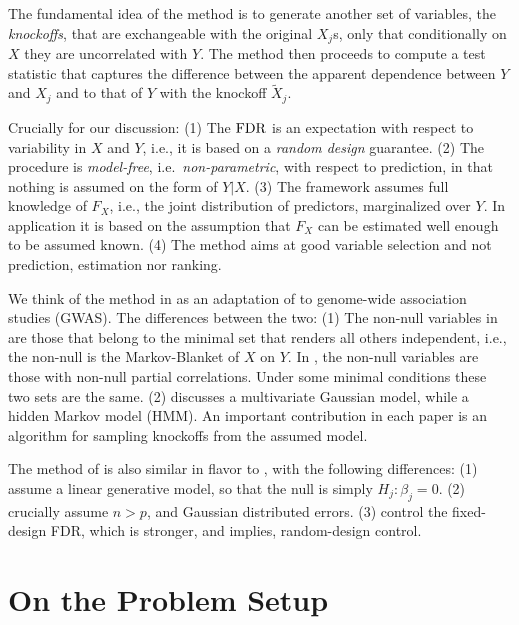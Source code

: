 \documentclass[article,lineno]{biometrika}
\begin{document}
	The fundamental idea of the method is to generate another set of variables, the \emph{knockoffs}, that are exchangeable with the original $X_j$s, only that  conditionally on $X$ they are uncorrelated with $Y$.
	The method then proceeds to compute a test statistic that captures the difference between the apparent dependence between $Y$ and $X_j$ and to that of $Y$ with the knockoff $\tilde X_j$.
	
	Crucially for our discussion:
	(1) The $\rm{FDR}$ is an expectation with respect to variability in $X$ and $Y$, i.e., it is based on  a \emph{random design} guarantee.
	(2) The procedure is \emph{model-free}, i.e.\ \emph{non-parametric}, with respect to prediction, in that nothing is assumed on the form of $Y|X$.
	(3) The framework assumes full knowledge of $F_X$, i.e., the joint distribution of predictors, marginalized over $Y$. In application it is based on the assumption that $F_X$ can be estimated well enough to be assumed known.
	(4) The method aims at good variable selection and not prediction, estimation nor ranking.
	
	We think of the method in \cite{SesiaGenehuntinghidden} as an adaptation of \cite{CandesPanninggoldmodelX2018} to genome-wide association studies (GWAS).
	The differences between the two:
	(1) The non-null variables in \cite{CandesPanninggoldmodelX2018} are those that belong to the minimal set that renders all others independent, i.e., the non-null is the Markov-Blanket of $X$ on $Y$.
	In \cite{SesiaGenehuntinghidden}, the non-null variables are those with non-null partial correlations. Under some minimal conditions these two sets are the same.
	(2) \cite{CandesPanninggoldmodelX2018} discusses a multivariate Gaussian model, while \cite{SesiaGenehuntinghidden} a hidden Markov model (HMM).
	An important contribution in each paper is an algorithm for sampling knockoffs from the assumed model.
	
	The method of \cite{SesiaGenehuntinghidden} is also similar in flavor to \cite{BarberControllingfalsediscovery2015}, with the following differences:
	(1) \cite{BarberControllingfalsediscovery2015} assume a linear generative model, so that the null is simply $H_j:\beta_j=0$.
	(2) \cite{BarberControllingfalsediscovery2015} crucially assume $n>p$, and Gaussian distributed errors.
	(3) \cite{BarberControllingfalsediscovery2015} control the fixed-design \rm{FDR}, which is stronger, and implies, random-design control.
	
	
	
	\section{On the Problem Setup}
	
\end{document}
